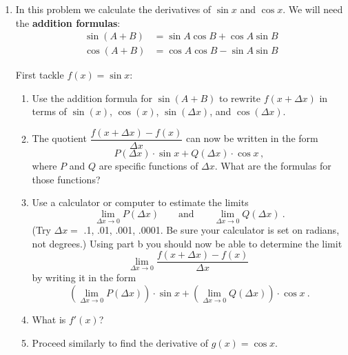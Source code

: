 \begin{enumerate}
\begin{enumerate}
  \item Do the algebra to re-express  $f'(x)$ as  $nx^{n-1}$.


\end{enumerate}
\item In this problem we calculate the derivatives of $\sin{x}$ and
$\cos{x}$.  We will need the {\bf addition formulas}:
\begin{align*}
	\sin(A + B) &= \sin{A}\cos{B} + \cos{A}\sin{B} \\
	\cos(A + B) &= \cos{A}\cos{B} - \sin{A}\sin{B}
\end{align*}


\noindent First tackle  $f(x) = \sin{x}$:


  \begin{enumerate}
  \item Use the addition formula for $\sin(A + B)$ to rewrite $f(x +
\Delta x)$ in terms of $\sin(x)$, $\cos(x)$, $\sin(\Delta x)$, and
$\cos(\Delta x)$.

  \item The quotient $\dfrac{f(x + \Delta x) -
  f(x)}{\Delta x}$ can now be written in the form
	\[
P(\Delta x) \cdot \sin{x} + Q(\Delta x) \cdot \cos{x} \, ,
\]
where $P$ and $Q$ are specific functions of $\Delta x$.  What are the formulas for those functions?

  \item Use a calculator or computer to estimate the limits
	\[
\lim_{\Delta x \to 0}P(\Delta x) \qquad \mbox{and} \qquad
		\lim_{\Delta x \to 0}Q(\Delta x) \ .
\]
(Try  $\Delta x =$ .1, .01, .001, .0001.  Be sure your calculator is set on radians, not degrees.)  Using part b you should now be able to determine the limit
	\[
\lim_{\Delta x \rightarrow 0} 
		\frac{f(x + \Delta x) - f(x)}{\Delta x} \
\]  
by writing it in the form
	\[
\left( \lim_{\Delta x \rightarrow 0} P(\Delta x) \right) 
					\cdot \sin{x} + 
	\left( \lim_{\Delta x \rightarrow 0} Q(\Delta x) \right) 
					\cdot \cos{x} \ .
\]


  \item What is  $f'(x)$?

  \item Proceed similarly to find  the derivative of $g(x) = \cos{x}$.




\end{enumerate}
\end{enumerate}
